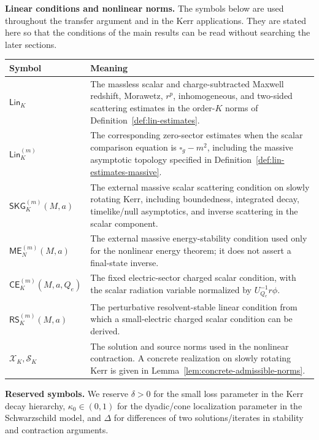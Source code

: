 \documentclass[11pt]{article}
\numberwithin{equation}{section}
\theoremstyle{plain}
\theoremstyle{definition}
\theoremstyle{remark}
\newcommand{\Lin}{\mathsf{Lin}}
\newcommand{\SKG}{\mathsf{SKG}}
\newcommand{\CElec}{\mathsf{CE}}
\newcommand{\RSLin}{\mathsf{RS}}
\newcommand{\ME}{\mathsf{ME}}
\begin{document}
\medskip
\noindent\textbf{Linear conditions and nonlinear norms.}
The symbols below are used throughout the transfer argument and in the Kerr applications.  They are stated here so that the conditions of the main results can be read without searching the later sections.
\begin{center}
\begin{tabularx}{0.96\textwidth}{>{\raggedright\arraybackslash}p{}X}
\hline
Symbol & Meaning \\
\hline
\(\Lin_K\) & The massless scalar and charge-subtracted Maxwell redshift, Morawetz, \(r^p\), inhomogeneous, and two-sided scattering estimates in the order-\(K\) norms of Definition~\ref{def:lin-estimates}. \\
\(\Lin_K^{(m)}\) & The corresponding zero-sector estimates when the scalar comparison equation is \(\square_g-m^2\), including the massive asymptotic topology specified in Definition~\ref{def:lin-estimates-massive}. \\
\(\SKG_K^{(m)}(M,a)\) & The external massive scalar scattering condition on slowly rotating Kerr, including boundedness, integrated decay, timelike/null asymptotics, and inverse scattering in the scalar component. \\
\(\ME_N^{(m)}(M,a)\) & The external massive energy-stability condition used only for the nonlinear energy theorem; it does not assert a final-state inverse. \\
\(\CElec_K^{(m)}(M,a,Q_e)\) & The fixed electric-sector charged scalar condition, with the scalar radiation variable normalized by \(U_{Q_e}^{-1}r\phi\). \\
\(\RSLin_K^{(m)}(M,a)\) & The perturbative resolvent-stable linear condition from which a small-electric charged scalar condition can be derived. \\
\(\mathcal X_K,\mathcal S_K\) & The solution and source norms used in the nonlinear contraction.  A concrete realization on slowly rotating Kerr is given in Lemma~\ref{lem:concrete-admissible-norms}. \\
\hline
\end{tabularx}
\end{center}

\medskip
\noindent\textbf{Reserved symbols.}
We reserve $\delta>0$ for the small loss parameter in the Kerr decay hierarchy, $\kappa_{0}\in(0,1)$ for the dyadic/cone localization parameter in the Schwarzschild model, and $\Delta$ for differences of two solutions/iterates in stability and contraction arguments.
\end{document}
